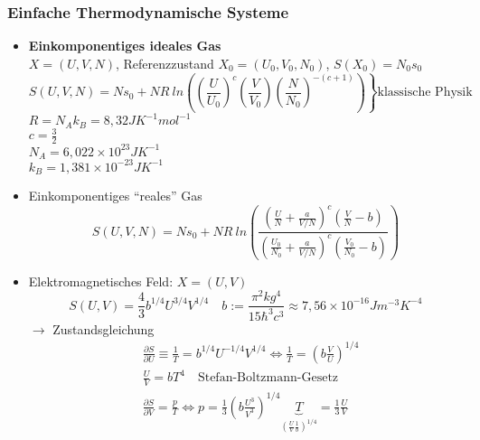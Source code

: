 \documentclass[10pt,article,colorback,accentcolor=tud9d]{scrartcl}
\begin{document}
\begin{fleqn}
\subsubsection{Einfache Thermodynamische Systeme}
\begin{itemize}
  \item \textbf{Einkomponentiges ideales Gas}\\
   $X=(U,V,N)$, Referenzzustand $X_0=(U_0,V_0,N_0)$, $S(X_0)=N_0s_0$
   \begin{equation}
   S(U,V,N)=Ns_0 +NR \ ln\left(\left.\left(\frac{U}{U_0}\right)^c\left(\frac{V}{V_0}\right)\left(\frac{N}{N_0}\right)^{-(c+1)}\right)\right\} \text{klassische Physik}
   \end{equation}
   $R=N_Ak_B=8,32JK^{-1}mol^{-1}$\\
   $c= \frac{3}{2}$\\
   $N_A=6,022 \times 10^{23}JK^{-1}$\\
   $k_B=1,381 \times 10^{-23}JK^{-1}$\\
  \item Einkomponentiges ``reales'' Gas
   \begin{equation}
   S(U,V,N)=Ns_0 + NR \ ln \left(\frac{\left(\frac{U}{N}+\frac{a}{V/N}\right)^c\left(\frac{V}{N} -b\right)}{\left(\frac{U_0}{N_0} + \frac{a}{V/N}\right)^c \left(\frac{V_0}{N_0}-b\right)}\right)
   \end{equation}
  \item Elektromagnetisches Feld: $X=(U,V)$\\
   \begin{equation}
    S(U,V)= \frac{4}{3}b^{1/4} U^{3/4}V^{1/4} \quad b:= \frac{\pi^2kg^4}{15 \hbar^3 c^3} \approx 7,56 \times 10^{-16} Jm^{-3}K^{-4}
    \end{equation}
   $\rightarrow$ Zustandsgleichung
   \begin{equation}
   \begin{aligned}
    &\frac{\partial S}{\partial U} \equiv \frac{1}{T} = b^{1/4} U^{-1/4} V^{1/4} \Leftrightarrow \frac{1}{T}=\left(b\frac{V}{U}\right)^{1/4}\\
    &\frac{U}{V}=bT^4 \quad \text{Stefan-Boltzmann-Gesetz}\\
    &\frac{\partial S }{\partial V}=\frac{p}{T} \Leftrightarrow p=\frac{1}{3}\left(b\frac{U^3}{V^3}\right)^{1/4}\underbrace{T}_{\left(\frac{U}{V}\frac{1}{b}\right)^{1/4}}=\frac{1}{3}\frac{U}{V}
   \end{aligned}
   \end{equation}
\end{itemize}

\end{fleqn}
\end{document}
